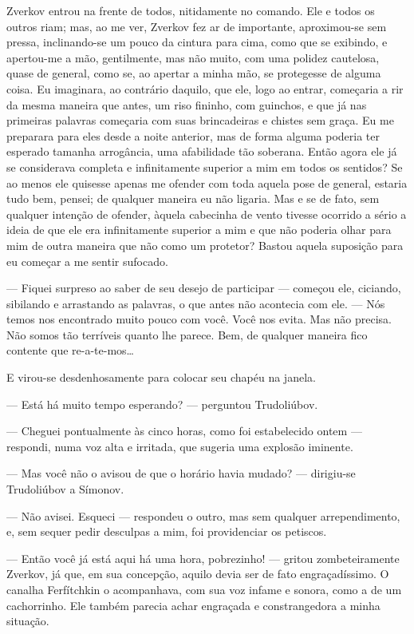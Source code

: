 Zverkov entrou na frente de todos, nitidamente no comando. Ele e todos
os outros riam; mas, ao me ver, Zverkov fez ar de importante,
aproximou-se sem pressa, inclinando-se um pouco da cintura para cima,
como que se exibindo, e apertou-me a mão, gentilmente, mas não muito,
com uma polidez cautelosa, quase de general, como se, ao apertar a
minha mão, se protegesse de alguma coisa. Eu imaginara, ao contrário
daquilo, que ele, logo ao entrar, começaria a rir da mesma maneira que
antes, um riso fininho, com guinchos, e que já nas primeiras palavras
começaria com suas brincadeiras e chistes sem graça. Eu me preparara
para eles desde a noite anterior, mas de forma alguma poderia ter
esperado tamanha arrogância, uma afabilidade tão soberana. Então agora
ele já se considerava completa e infinitamente superior a mim em todos
os sentidos? Se ao menos ele quisesse apenas me ofender com toda aquela
pose de general, estaria tudo bem, pensei; de qualquer maneira eu não
ligaria. Mas e se de fato, sem qualquer intenção de ofender, àquela
cabecinha de vento tivesse ocorrido a sério a ideia de que ele era
infinitamente superior a mim e que não poderia olhar para mim de outra
maneira que não como um protetor? Bastou aquela suposição para eu
começar a me sentir sufocado.

--- Fiquei surpreso ao saber de seu desejo de participar --- começou ele,
ciciando, sibilando e arrastando as palavras, o que antes não acontecia
com ele. --- Nós temos nos encontrado muito pouco com você. Você nos
evita. Mas não precisa. Não somos tão terríveis quanto lhe parece. Bem,
de qualquer maneira fico contente que re-a-te-mos\ldots{}

E virou-se desdenhosamente para colocar seu chapéu na janela.

--- Está há muito tempo esperando? --- perguntou Trudoliúbov.

--- Cheguei pontualmente às cinco horas, como foi estabelecido ontem ---
respondi, numa voz alta e irritada, que sugeria uma explosão iminente.

--- Mas você não o avisou de que o horário havia mudado? --- dirigiu-se
Trudoliúbov a Símonov.

--- Não avisei. Esqueci --- respondeu o outro, mas sem qualquer
arrependimento, e, sem sequer pedir desculpas a mim, foi providenciar
os petiscos.

--- Então você já está aqui há uma hora, pobrezinho! --- gritou
zombeteiramente Zverkov, já que, em sua concepção, aquilo devia ser de
fato engraçadíssimo. O canalha Ferfítchkin o acompanhava, com sua voz
infame e sonora, como a de um cachorrinho. Ele também parecia achar
engraçada e constrangedora a minha situação.

